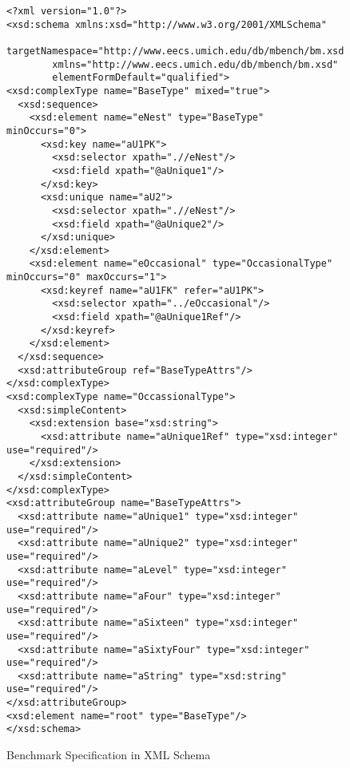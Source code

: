 \renewcommand{\baselinestretch}{1.1}
\begin {figure}
\begin{small}
\begin{verbatim}
<?xml version="1.0"?>
<xsd:schema xmlns:xsd="http://www.w3.org/2001/XMLSchema"
        targetNamespace="http://www.eecs.umich.edu/db/mbench/bm.xsd"
        xmlns="http://www.eecs.umich.edu/db/mbench/bm.xsd"
        elementFormDefault="qualified">
<xsd:complexType name="BaseType" mixed="true">
  <xsd:sequence>
    <xsd:element name="eNest" type="BaseType" minOccurs="0">
      <xsd:key name="aU1PK">
        <xsd:selector xpath=".//eNest"/>
        <xsd:field xpath="@aUnique1"/>
      </xsd:key>
      <xsd:unique name="aU2">
        <xsd:selector xpath=".//eNest"/>
        <xsd:field xpath="@aUnique2"/>
      </xsd:unique>
    </xsd:element>
    <xsd:element name="eOccasional" type="OccasionalType" minOccurs="0" maxOccurs="1">
      <xsd:keyref name="aU1FK" refer="aU1PK">
        <xsd:selector xpath="../eOccasional"/>
        <xsd:field xpath="@aUnique1Ref"/>
      </xsd:keyref>
    </xsd:element>
  </xsd:sequence>
  <xsd:attributeGroup ref="BaseTypeAttrs"/>
</xsd:complexType>
<xsd:complexType name="OccassionalType">
  <xsd:simpleContent>
    <xsd:extension base="xsd:string">
      <xsd:attribute name="aUnique1Ref" type="xsd:integer" use="required"/>
    </xsd:extension>
  </xsd:simpleContent>
</xsd:complexType>
<xsd:attributeGroup name="BaseTypeAttrs">
  <xsd:attribute name="aUnique1" type="xsd:integer" use="required"/>
  <xsd:attribute name="aUnique2" type="xsd:integer" use="required"/>
  <xsd:attribute name="aLevel" type="xsd:integer" use="required"/>
  <xsd:attribute name="aFour" type="xsd:integer" use="required"/>
  <xsd:attribute name="aSixteen" type="xsd:integer" use="required"/>
  <xsd:attribute name="aSixtyFour" type="xsd:integer" use="required"/>
  <xsd:attribute name="aString" type="xsd:string" use="required"/>
</xsd:attributeGroup>
<xsd:element name="root" type="BaseType"/>
</xsd:schema>
\end{verbatim}
\end{small}
\caption{Benchmark Specification in XML Schema}
\label{fig:bench-schema}
\end {figure}
\renewcommand{\baselinestretch}{\cheatbaseline}



